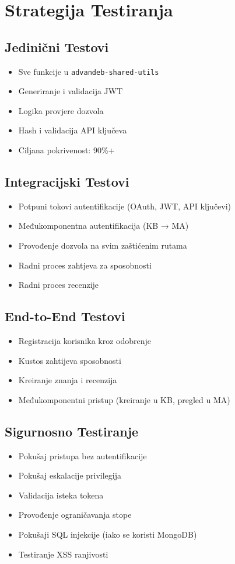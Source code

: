 \documentclass[12pt,a4paper]{article}
\begin{document}
\section{Strategija Testiranja}

\subsection{Jedinični Testovi}
\begin{itemize}
    \item Sve funkcije u \texttt{advandeb-shared-utils}
    \item Generiranje i validacija JWT
    \item Logika provjere dozvola
    \item Hash i validacija API ključeva
    \item Ciljana pokrivenost: 90\%+
\end{itemize}

\subsection{Integracijski Testovi}
\begin{itemize}
    \item Potpuni tokovi autentifikacije (OAuth, JWT, API ključevi)
    \item Međukomponentna autentifikacija (KB → MA)
    \item Provođenje dozvola na svim zaštićenim rutama
    \item Radni proces zahtjeva za sposobnosti
    \item Radni proces recenzije
\end{itemize}

\subsection{End-to-End Testovi}
\begin{itemize}
    \item Registracija korisnika kroz odobrenje
    \item Kustos zahtijeva sposobnosti
    \item Kreiranje znanja i recenzija
    \item Međukomponentni pristup (kreiranje u KB, pregled u MA)
\end{itemize}

\subsection{Sigurnosno Testiranje}
\begin{itemize}
    \item Pokušaj pristupa bez autentifikacije
    \item Pokušaj eskalacije privilegija
    \item Validacija isteka tokena
    \item Provođenje ograničavanja stope
    \item Pokušaji SQL injekcije (iako se koristi MongoDB)
    \item Testiranje XSS ranjivosti
\end{itemize}
\end{document}
